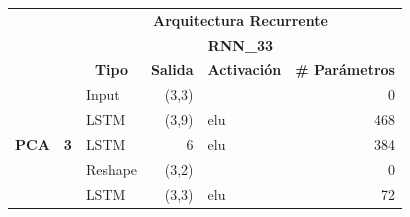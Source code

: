 \begin{table}[H]
\centering
\begin{center}
\begin{tabular}{ll|l|r|l|r|}
\cline{3-6}
                                                    &                             & \multicolumn{4}{c|}{\textbf{Arquitectura Recurrente}}                                                                                                           \\ \cline{3-6} 
                                                    &                             & \multicolumn{4}{c|}{\textbf{RNN\_33}}                                                                                                                                  \\ \cline{3-6} 
                                                    &                             & \multicolumn{1}{c|}{\textbf{Tipo}} & \multicolumn{1}{c|}{\textbf{Salida}} & \multicolumn{1}{c|}{\textbf{Activaci\'{o}n}} & \multicolumn{1}{l|}{\textbf{\# Par\'{a}metros}} \\ \hline
\multicolumn{1}{|l|}{\multirow{7}{*}{\textbf{PCA}}} & \multirow{7}{*}{\textbf{3}} & Input                              & (3,3)                                &                                          & 0                                           \\ \cline{3-6} 
\multicolumn{1}{|l|}{}                             &                             & LSTM                               & (3,9)                                & elu                                     & 468                                         \\ \cline{3-6} 
\multicolumn{1}{|l|}{}                              &                             & LSTM                               & 6                                    & elu                                     & 384                                         \\ \cline{3-6} 
\multicolumn{1}{|l|}{}                              &                             & Reshape                            & (3,2)                                &                                          & 0                                           \\ \cline{3-6} 
\multicolumn{1}{|l|}{}                              &                             & LSTM                               & (3,3)                                & elu                                     & 72                                          \\ \cline{3-6} 

\end{tabular}
\end{center}
\end{table}
